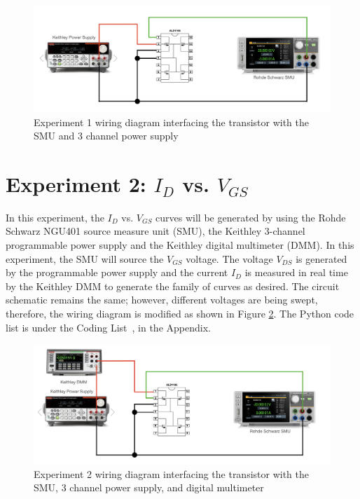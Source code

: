 \begin{figure}[ht]
    \includegraphics[scale=0.4]{graphics/Lab_01_1_1.png}
    \caption{Experiment 1 wiring diagram interfacing the transistor with the SMU and 3 channel power supply}
    \label{Ch1_fig:1}
\end{figure}

\section{Experiment 2: \texorpdfstring{$I_{D}$ vs. $V_{GS}$}{ID vs. VDS}}
In this experiment, the $I_{D}$ vs. $V_{GS}$ curves will be generated by using the Rohde Schwarz NGU401 source measure unit (SMU), the Keithley 3-channel programmable power supply and the Keithley digital multimeter (DMM). In this experiment, the SMU will source the $V_{GS}$ voltage. The voltage $V_{DS}$ is generated by the programmable power supply and the current $I_{D}$ is measured in real time by the Keithley DMM to generate the family of curves as desired. The circuit schematic remains the same; however, different voltages are being swept, therefore, the wiring diagram is modified as shown in Figure \ref{Ch1_fig:2}. The Python code list is under the Coding List~, in the Appendix. 

\begin{figure}[ht]
    \includegraphics[scale=0.9\linewidth]{graphics/Lab_01_1_2.png}
    \caption{Experiment 2 wiring diagram interfacing the transistor with the SMU, 3 channel power supply, and digital multimeter}
    \label{Ch1_fig:2}
\end{figure}

